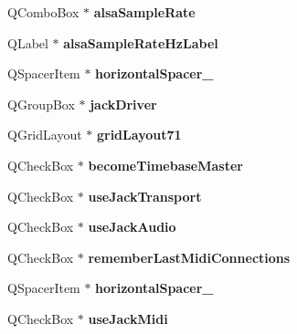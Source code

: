 \begin{DoxyCompactItemize}
Q\+Combo\+Box $\ast$ {\bfseries alsa\+Sample\+Rate}
\item 
\mbox{\label{class_ui___prefs_dialog_base_a81516846503f9d19731e46221d4558e6}} 
Q\+Label $\ast$ {\bfseries alsa\+Sample\+Rate\+Hz\+Label}
\item 
\mbox{\label{class_ui___prefs_dialog_base_af35a644178556d4db1e736ee73fe4db8}} 
Q\+Spacer\+Item $\ast$ {\bfseries horizontal\+Spacer\+\_}
\item 
\mbox{\label{class_ui___prefs_dialog_base_a2f8eb72955fa137d1ff9e56e645dafdd}} 
Q\+Group\+Box $\ast$ {\bfseries jack\+Driver}
\item 
\mbox{\label{class_ui___prefs_dialog_base_a36d4be97ca2aea6e1c6cc5185ea43f87}} 
Q\+Grid\+Layout $\ast$ {\bfseries grid\+Layout71}
\item 
\mbox{\label{class_ui___prefs_dialog_base_a90c43addac8d22ea61a63d350b841464}} 
Q\+Check\+Box $\ast$ {\bfseries become\+Timebase\+Master}
\item 
\mbox{\label{class_ui___prefs_dialog_base_a9f1c7e013e1fb0eb70f47af906ddd6de}} 
Q\+Check\+Box $\ast$ {\bfseries use\+Jack\+Transport}
\item 
\mbox{\label{class_ui___prefs_dialog_base_ad2779abcc3bbc306ff0109b28c2978b5}} 
Q\+Check\+Box $\ast$ {\bfseries use\+Jack\+Audio}
\item 
\mbox{\label{class_ui___prefs_dialog_base_a1b2cf09ebad64fa5c30d1f58af17c152}} 
Q\+Check\+Box $\ast$ {\bfseries remember\+Last\+Midi\+Connections}
\item 
\mbox{\label{class_ui___prefs_dialog_base_ab52c8f8b1080251a6fc8d48032635e02}} 
Q\+Spacer\+Item $\ast$ {\bfseries horizontal\+Spacer\+\_}
\item 
\mbox{\label{class_ui___prefs_dialog_base_a0dc55ec26072d83663a9680bd2f07678}} 
Q\+Check\+Box $\ast$ {\bfseries use\+Jack\+Midi}

\end{DoxyCompactItemize}
